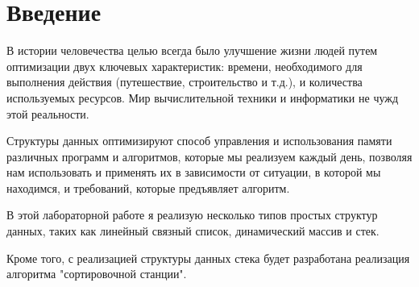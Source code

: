 
\section{Введение}

В истории человечества целью всегда было улучшение жизни
людей путем оптимизации двух ключевых характеристик: времени,
необходимого для выполнения действия (путешествие, строительство и т.д.),
и количества используемых ресурсов. Мир вычислительной техники и
информатики не чужд этой реальности.

Структуры данных оптимизируют способ управления и использования памяти
различных программ и алгоритмов, которые мы реализуем каждый день,
позволяя нам использовать и применять их в зависимости от ситуации,
в которой мы находимся, и требований, которые предъявляет алгоритм.

В этой лабораторной работе я реализую несколько типов простых
структур данных, таких как линейный связный список,
динамический массив и стек.

Кроме того, с реализацией структуры данных стека будет
разработана реализация алгоритма "сортировочной станции".

